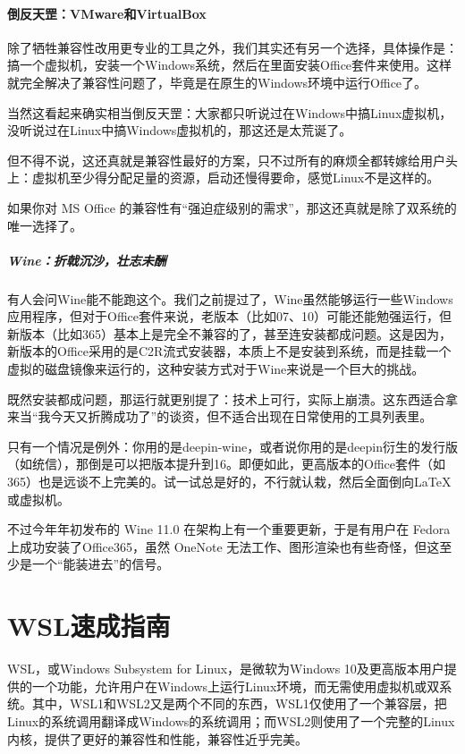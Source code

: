 \paragraph{倒反天罡：VMware和VirtualBox} 除了牺牲兼容性改用更专业的工具之外，我们其实还有另一个选择，具体操作是：搞一个虚拟机，安装一个Windows系统，然后在里面安装Office套件来使用。这样就完全解决了兼容性问题了，毕竟是在原生的Windows环境中运行Office了。

当然这看起来确实相当倒反天罡：大家都只听说过在Windows中搞Linux虚拟机，没听说过在Linux中搞Windows虚拟机的，那这还是太荒诞了。

但不得不说，这还真就是兼容性最好的方案，只不过所有的麻烦全都转嫁给用户头上：虚拟机至少得分配足量的资源，启动还慢得要命，感觉Linux不是这样的。

如果你对 MS Office 的兼容性有“强迫症级别的需求”，那这还真就是除了双系统的唯一选择了。

\subparagraph{Wine：折戟沉沙，壮志未酬} 有人会问Wine能不能跑这个。我们之前提过了，Wine虽然能够运行一些Windows应用程序，但对于Office套件来说，老版本（比如07、10）可能还能勉强运行，但新版本（比如365）基本上是完全不兼容的了，甚至连安装都成问题。这是因为，新版本的Office采用的是C2R流式安装器，本质上不是安装到系统，而是挂载一个虚拟的磁盘镜像来运行的，这种安装方式对于Wine来说是一个巨大的挑战。

既然安装都成问题，那运行就更别提了：技术上可行，实际上崩溃。这东西适合拿来当“我今天又折腾成功了”的谈资，但不适合出现在日常使用的工具列表里。

只有一个情况是例外：你用的是deepin-wine，或者说你用的是deepin衍生的发行版（如统信），那倒是可以把版本提升到16。即便如此，更高版本的Office套件（如365）也是远谈不上完美的。试一试总是好的，不行就认栽，然后全面倒向LaTeX或虚拟机。

不过今年年初发布的 Wine 11.0 在架构上有一个重要更新，于是有用户在 Fedora 上成功安装了Office365，虽然 OneNote 无法工作、图形渲染也有些奇怪，但这至少是一个“能装进去”的信号。

\section{WSL速成指南}\label{sec:wsl}

WSL，或Windows Subsystem for Linux，是微软为Windows 10及更高版本用户提供的一个功能，允许用户在Windows上运行Linux环境，而无需使用虚拟机或双系统。其中，WSL1和WSL2又是两个不同的东西，WSL1仅使用了一个兼容层，把Linux的系统调用翻译成Windows的系统调用；而WSL2则使用了一个完整的Linux内核，提供了更好的兼容性和性能，兼容性近乎完美。

